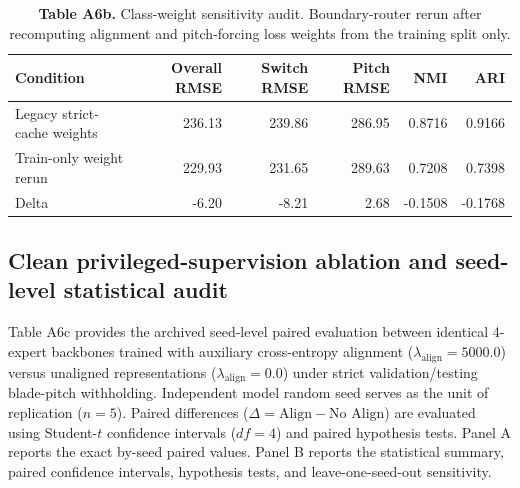 \documentclass[
  journal]{IEEEtran}
\begin{document}
\begin{table}[!t]
\centering
\fontsize{8.0pt}{9.6pt}\selectfont
\setlength{\tabcolsep}{3pt}
\renewcommand{\arraystretch}{1.05}
\caption*{\textbf{Table A6b.} Class-weight sensitivity audit. Boundary-router rerun after recomputing alignment and pitch-forcing loss weights from the training split only.}
%
\begin{tabular}{lrrrrr}
\toprule
Condition & Overall RMSE & Switch RMSE & Pitch RMSE & NMI & ARI \\
\midrule
Legacy strict-cache weights & 236.13 & 239.86 & 286.95 & 0.8716 & 0.9166 \\
Train-only weight rerun & 229.93 & 231.65 & 289.63 & 0.7208 & 0.7398 \\
Delta & -6.20 & -8.21 & 2.68 & -0.1508 & -0.1768 \\
\bottomrule
\end{tabular}
\end{table}

\FloatBarrier

\subsection*{Clean privileged-supervision ablation and seed-level
statistical
audit}\label{clean-privileged-supervision-ablation-and-seed-level-statistical-audit}

Table A6c provides the archived seed-level paired evaluation between
identical 4-expert backbones trained with auxiliary cross-entropy
alignment (\(\lambda_{\text{align}}=5000.0\)) versus unaligned
representations (\(\lambda_{\text{align}}=0.0\)) under strict
validation/testing blade-pitch withholding. Independent model random
seed serves as the unit of replication (\(n=5\)). Paired differences
(\(\Delta = \text{Align} - \text{No Align}\)) are evaluated using
Student-\(t\) confidence intervals (\(df=4\)) and paired hypothesis
tests. Panel A reports the exact by-seed paired values. Panel B reports
the statistical summary, paired confidence intervals, hypothesis tests,
and leave-one-seed-out sensitivity.
\end{document}
